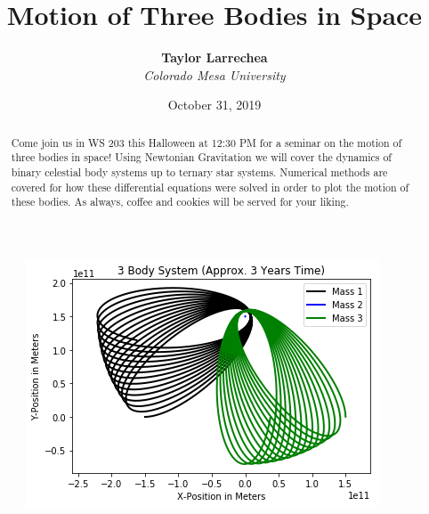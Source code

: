 \documentclass[11pt]{diazessay} %
\title{\textbf{Motion of Three Bodies in Space}} %
\author{\textbf{Taylor Larrechea} \\ \textit{Colorado Mesa University}} %
\date{October 31, 2019} %
\begin{document}
\maketitle %


\begin{abstract}
Come join us in WS 203 this Halloween at 12:30 PM for a seminar on the motion of three bodies in space! Using Newtonian Gravitation we will cover the dynamics of binary celestial body systems up to ternary star systems. Numerical methods are covered for how these differential equations were solved in order to plot the motion of these bodies. As always, coffee and cookies will be served for your liking.
\end{abstract}

\begin{center}
\begin{figure}[htpb]
\includegraphics[width=1.00\linewidth]{Figures/3BodyDynamics.png}
\end{figure}
\end{center}
\end{document}
